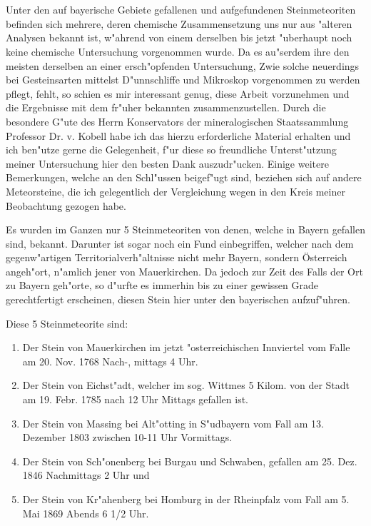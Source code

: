 \documentclass[a4paper, 11pt, oneside]{article}
\begin{document}
\section{}
\subsection*{}
\paragraph{}
Unter den auf bayerische Gebiete gefallenen und aufgefundenen Steinmeteoriten befinden sich mehrere, deren chemische Zusammensetzung uns nur aus "alteren Analysen bekannt ist, w"ahrend von einem derselben bis jetzt "uberhaupt noch keine chemische Untersuchung vorgenommen wurde. Da es au"serdem ihre den meisten derselben an einer ersch"opfenden Untersuchung, Zwie solche neuerdings bei Gesteinsarten mittelst D"unnschliffe und Mikroskop vorgenommen zu werden pflegt, fehlt, so schien es mir interessant genug, diese Arbeit vorzunehmen und die Ergebnisse mit dem fr"uher bekannten zusammenzustellen. Durch die besondere G"ute des Herrn Konservators der mineralogischen Staatssammlung Professor Dr. v. Kobell habe ich das hierzu erforderliche Material erhalten und ich ben"utze gerne die Gelegenheit, f"ur diese so freundliche Unterst"utzung meiner Untersuchung hier den besten Dank auszudr"ucken. Einige weitere Bemerkungen, welche an den Schl"ussen beigef"ugt sind, beziehen sich auf andere Meteorsteine, die ich gelegentlich der Vergleichung wegen in den Kreis meiner Beobachtung gezogen habe.

Es wurden im Ganzen nur 5 Steinmeteoriten von denen, welche in Bayern gefallen sind, bekannt. Darunter ist sogar noch ein Fund einbegriffen, welcher nach dem gegenw"artigen Territorialverh"altnisse nicht mehr Bayern, sondern Österreich angeh"ort, n"amlich jener von Mauerkirchen. Da jedoch zur Zeit des Falls der Ort zu Bayern geh"orte, so d"urfte es immerhin bis zu einer gewissen Grade gerechtfertigt erscheinen, diesen Stein hier unter den bayerischen aufzuf"uhren.

Diese 5 Steinmeteorite sind:
\begin{enumerate}
    \item Der Stein von Mauerkirchen im jetzt "osterreichischen Innviertel vom Falle am 20. Nov. 1768 Nach-, mittags 4 Uhr.
    \item Der Stein von Eichst"adt, welcher im sog. Wittmes 5 Kilom. von der Stadt am 19. Febr. 1785 nach 12 Uhr Mittags gefallen ist.
    \item Der Stein von Massing bei Alt"otting in S"udbayern vom Fall am 13. Dezember 1803 zwischen 10-11 Uhr Vormittags.
    \item Der Stein von Sch"onenberg bei Burgau und Schwaben, gefallen am 25. Dez. 1846 Nachmittags 2 Uhr und
    \item Der Stein von Kr"ahenberg bei Homburg in der Rheinpfalz vom Fall am 5. Mai 1869 Abends 6 1/2 Uhr.
\end{enumerate}
\end{document}
